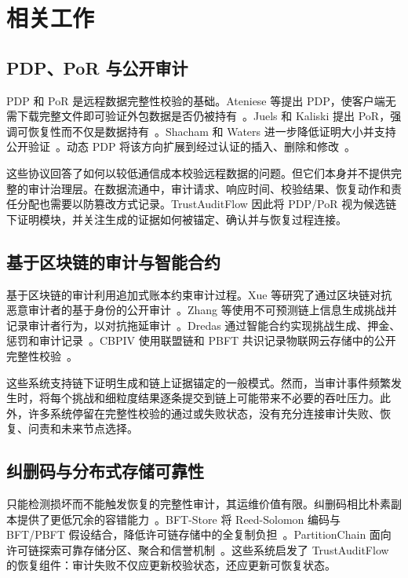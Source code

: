 \section{相关工作}

\subsection{PDP、PoR 与公开审计}

PDP 和 PoR 是远程数据完整性校验的基础。Ateniese 等提出 PDP，使客户端无需下载完整文件即可验证外包数据是否仍被持有~\cite{ateniese_provable_2007}。Juels 和 Kaliski 提出 PoR，强调可恢复性而不仅是数据持有~\cite{juels_pors_2007}。Shacham 和 Waters 进一步降低证明大小并支持公开验证~\cite{shacham_compact_2013}。动态 PDP 将该方向扩展到经过认证的插入、删除和修改~\cite{erway_dynamic_2015}。

这些协议回答了如何以较低通信成本校验远程数据的问题。但它们本身并不提供完整的审计治理层。在数据流通中，审计请求、响应时间、校验结果、恢复动作和责任分配也需要以防篡改方式记录。TrustAuditFlow 因此将 PDP/PoR 视为候选链下证明模块，并关注生成的证据如何被锚定、确认并与恢复过程连接。

\subsection{基于区块链的审计与智能合约}

基于区块链的审计利用追加式账本约束审计过程。Xue 等研究了通过区块链对抗恶意审计者的基于身份的公开审计~\cite{xue_identity-based_2019}。Zhang 等使用不可预测链上信息生成挑战并记录审计者行为，以对抗拖延审计~\cite{zhang_blockchain-based_2021}。Dredas 通过智能合约实现挑战生成、押金、惩罚和审计记录~\cite{fan_dredas_2020}。CBPIV 使用联盟链和 PBFT 共识记录物联网云存储中的公开完整性校验~\cite{lin_consortium_2022}。

这些系统支持链下证明生成和链上证据锚定的一般模式。然而，当审计事件频繁发生时，将每个挑战和细粒度结果逐条提交到链上可能带来不必要的吞吐压力。此外，许多系统停留在完整性校验的通过或失败状态，没有充分连接审计失败、恢复、问责和未来节点选择。

\subsection{纠删码与分布式存储可靠性}

只能检测损坏而不能触发恢复的完整性审计，其运维价值有限。纠删码相比朴素副本提供了更低冗余的容错能力~\cite{balaji_erasure_2018}。BFT-Store 将 Reed-Solomon 编码与 BFT/PBFT 假设结合，降低许可链存储中的全复制负担~\cite{qi_reliable_2021}。PartitionChain 面向许可链探索可靠存储分区、聚合和信誉机制~\cite{du_partitionchain_2023}。这些系统启发了 TrustAuditFlow 的恢复组件：审计失败不仅应更新校验状态，还应更新可恢复状态。


